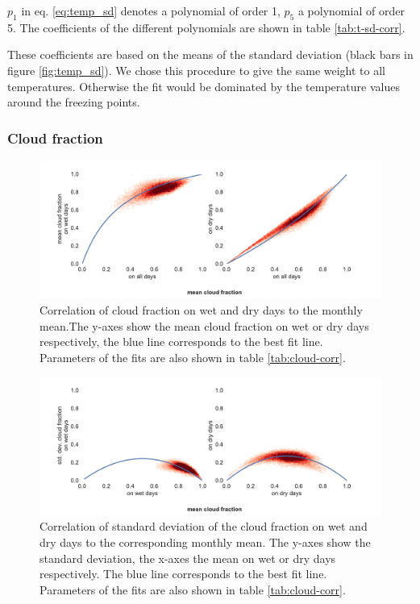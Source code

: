 \documentclass[
11pt, %
english, %
singlespacing, %
headsepline, %
]{MastersDoctoralThesis} %
\begin{document}
\begin{NoHyper}
\begin{refsection}
$p_1$ in eq. \eqref{eq:temp_sd} denotes a polynomial of order 1, $p_5$ a polynomial of order 5. The coefficients of the different polynomials are shown in table \ref{tab:t-sd-corr}.

These coefficients are based on the means of the standard deviation (black bars in figure \ref{fig:temp_sd}). We chose this procedure to give the same weight to all temperatures. Otherwise the fit would be dominated by the temperature values around the freezing points.

\subsubsection{Cloud fraction}
\begin{figure}
	\includegraphics[width=\linewidth]{gwgen-figures/f08.pdf}
	\caption[Correlation of cloud fraction on wet and dry days to the monthly mean]{Correlation of cloud fraction on wet and dry days to the monthly mean.The y-axes show the mean cloud fraction on wet or dry days respectively, the blue line corresponds to the best fit line. Parameters of the fits are also shown in table \ref{tab:cloud-corr}.}
	\label{fig:cloud}
\end{figure}
\begin{figure}
	\includegraphics[width=\linewidth]{gwgen-figures/f09.pdf}
	\caption[Correlation of standard deviation of cloud fraction to the monthly mean]{Correlation of standard deviation of the cloud fraction on wet and dry days to the corresponding monthly mean. The y-axes show the standard deviation, the x-axes the mean on wet or dry days respectively. The blue line corresponds to the best fit line. Parameters of the fits are also shown in table \ref{tab:cloud-corr}.}

\end{figure}
\end{refsection}
\end{NoHyper}
\end{document}
